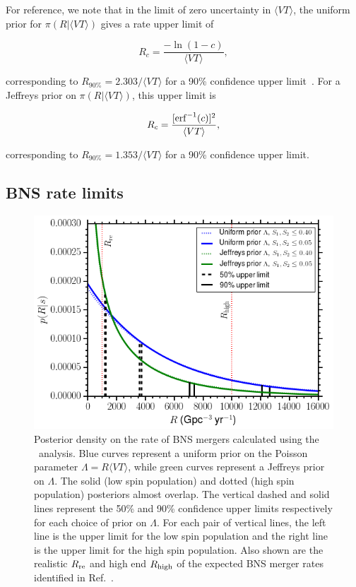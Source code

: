 For reference, we note that in the limit of zero uncertainty in $\langle VT \rangle$,
the uniform prior for $\pi(R | \langle VT \rangle)$ gives a rate upper limit of
%
\begin{linenomath*}
\begin{equation}
R_c = \frac{ -\ln(1-c) }{ \langle VT \rangle },
\end{equation}
\end{linenomath*}
%
corresponding to $R_{90\%} = 2.303/\langle VT \rangle$ for a 90\% confidence upper
limit~\citep{Biswas:2007ni}. For a Jeffreys prior on $\pi(R | \langle VT \rangle)$, this upper limit is
%
\begin{linenomath*}
\begin{equation}
R_c = \frac{ [{\rm erf}^{-1}(c)]^2 }{ \langle VT \rangle },
\end{equation}
\end{linenomath*}
%
corresponding to $R_{90\%} = 1.353/\langle VT \rangle$ for a 90\% confidence upper limit.


\subsection{BNS rate limits}
\label{ssec:bns_rate_limits}

\begin{figure}[t]
   \centering
   \includegraphics[width=\columnwidth]{figs/chapter3/figure3.png} 
   \caption{Posterior density on the rate of \ac{BNS} mergers calculated using the \pycbc\ analysis.
   Blue curves represent
   a uniform prior on the Poisson parameter $\Lambda = R \langle VT \rangle$, while
   green curves represent a Jeffreys prior on $\Lambda$. The solid (low spin population)
   and dotted (high spin population) posteriors almost overlap. The vertical dashed and
   solid lines represent the 50\% and 90\% confidence upper limits respectively for each
   choice of prior on $\Lambda$. For each pair of vertical lines, the left line is the 
   upper limit for the low spin population and the right line is the upper limit for the high
   spin population. Also shown are the realistic $R_{\rm re}$ and high end
   $R_{\rm high}$ of the expected \ac{BNS} merger rates identified in Ref.~\citep{Abadie:2010cf}.}
   \label{fig:bnspdf}
\end{figure}

